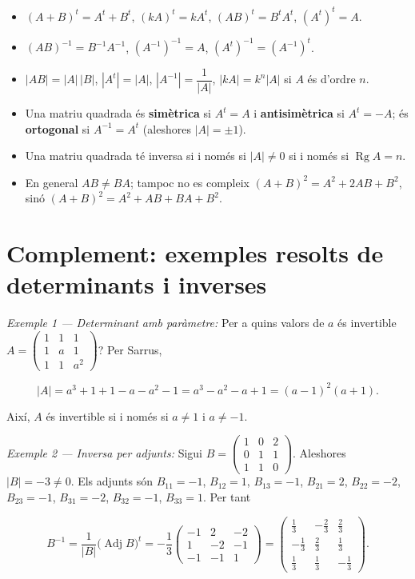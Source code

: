 \begin{itemize}
\item $(A+B)^{t}=A^{t}+B^{t}$, $(kA)^{t}=kA^{t}$, $(AB)^{t}=B^{t}A^{t}$, $(A^{t})^{t}=A$.
\item $(AB)^{-1}=B^{-1}A^{-1}$, $(A^{-1})^{-1}=A$, $(A^{t})^{-1}=(A^{-1})^{t}$.
\item $|AB|=|A|\,|B|$, $|A^{t}|=|A|$, $|A^{-1}|=\dfrac1{|A|}$, $|kA|=k^{n}|A|$ si $A$ és d'ordre $n$.
\item Una matriu quadrada és \textbf{simètrica} si $A^{t}=A$ i \textbf{antisimètrica} si $A^{t}=-A$; és \textbf{ortogonal} si $A^{-1}=A^{t}$ (aleshores $|A|=\pm1$).
\item Una matriu quadrada té inversa si i només si $|A|\neq0$ si i només si $\operatorname{Rg}A=n$.
\item En general $AB\neq BA$; tampoc no es compleix $(A+B)^2=A^2+2AB+B^2$, sinó $(A+B)^2=A^2+AB+BA+B^2$.
\end{itemize}

\section{Complement: exemples resolts de determinants i inverses}

\emph{Exemple 1 --- Determinant amb paràmetre:} Per a quins valors de $a$ és invertible $A=\begin{pmatrix}1&1&1\\1&a&1\\1&1&a^2\end{pmatrix}$? Per Sarrus,

\begin{equation*}
|A|=a^3+1+1-a-a^2-1=a^3-a^2-a+1=(a-1)^2(a+1).
\end{equation*}

Així, $A$ és invertible si i només si $a\neq1$ i $a\neq-1$.

\emph{Exemple 2 --- Inversa per adjunts:} Sigui $B=\begin{pmatrix}1&0&2\\0&1&1\\1&1&0\end{pmatrix}$. Aleshores $|B|=-3\neq0$. Els adjunts són $B_{11}=-1$, $B_{12}=1$, $B_{13}=-1$, $B_{21}=2$, $B_{22}=-2$, $B_{23}=-1$, $B_{31}=-2$, $B_{32}=-1$, $B_{33}=1$. Per tant

\begin{equation*}
B^{-1}=\frac{1}{|B|}\bigl(\operatorname{Adj}B\bigr)^{t}=-\frac13\begin{pmatrix}-1&2&-2\\1&-2&-1\\-1&-1&1\end{pmatrix}=\begin{pmatrix}\frac13&-\frac23&\frac23\\-\frac13&\frac23&\frac13\\\frac13&\frac13&-\frac13\end{pmatrix}.
\end{equation*}

